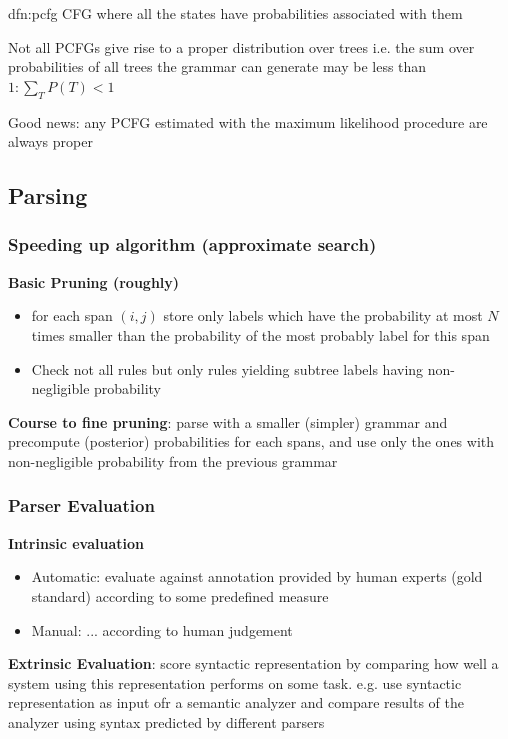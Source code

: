 \documentclass[landscape, 8pt]{extarticle}
\begin{document}
\begin{multicols}{3}
\begin{dfn}{dfn:pcfg}{}
    CFG where all the states have probabilities associated with them

    Not all PCFGs give rise to a proper distribution over trees i.e. the sum over probabilities of all trees the grammar can generate may be less than $1 : \sum_{T} P(T) < 1$

    Good news: any PCFG estimated with the maximum likelihood procedure are always proper
\end{dfn}

\newpage

\subsection{Parsing}

\subsubsection{Speeding up algorithm (approximate search)}
\textbf{Basic Pruning (roughly)}
\begin{itemize}
    \setlength\itemsep{0em}
    \item for each span $(i, j)$ store only labels which have the probability at most $N$ times smaller than the probability of the most probably label for this span
    \item Check not all rules but only rules yielding subtree labels having non-negligible probability
\end{itemize}
\textbf{Course to fine pruning}: parse with a smaller (simpler) grammar and precompute (posterior) probabilities for each spans, and use only the ones with non-negligible probability from the previous grammar

\subsubsection{Parser Evaluation}
\textbf{Intrinsic evaluation}
\begin{itemize}
    \setlength\itemsep{0em}
    \item Automatic: evaluate against annotation provided by human experts (gold standard) according to some predefined measure
    \item Manual: ... according to human judgement
\end{itemize}
\textbf{Extrinsic Evaluation}: score syntactic representation by comparing how well a system using this representation performs on some task. e.g. use syntactic representation as input ofr a semantic analyzer and compare results of the analyzer using syntax predicted by different parsers


\end{multicols}
\end{document}

